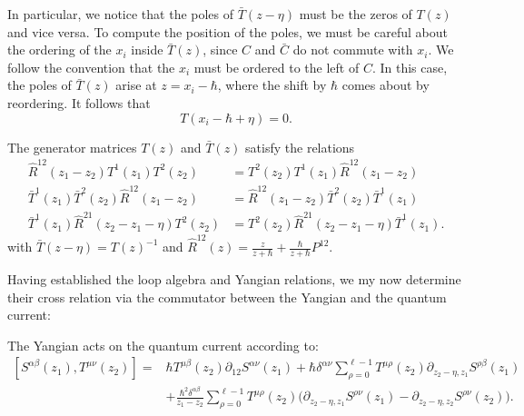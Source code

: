 \begin{remark}
In particular, we notice that the poles of $\bar{T}(z-\eta)$ must be the zeros of $T(z)$ and vice versa. To compute the position of the poles, we must be careful about the ordering of the $x_i$ inside $\bar{T}(z)$, since $C$ and $\bar C$ do not commute with $x_i$. We follow the convention that the $x_i$ must be ordered to the left of $C$. In this case, the poles of $\bar{T}(z)$ arise at $z=x_i-\hbar$, where the shift by $\hbar$ comes about by reordering. It follows that
\begin{equation}
T(x_i-\hbar+\eta) = 0.
\end{equation}
\end{remark}

\begin{theorem}
The generator matrices $T(z)$ and $\bar{T}(z)$ satisfy the relations
\begin{align}
\hat R^{12}(z_1-z_2) T^1(z_1) T^2(z_2) &= T^2(z_2) T^1(z_1) \hat R^{12}(z_1-z_2) \\
\bar{T}^1(z_1) \bar{T}^2(z_2) \hat R^{12}(z_1-z_2) &= \hat R^{12}(z_1-z_2) \bar{T}^2(z_2) \bar{T}^1(z_1) \\
\bar{T}^1(z_1) \hat R^{21}(z_2-z_1-\eta) T^2(z_2) &= T^2(z_2) \hat R^{21}(z_2-z_1-\eta) \bar{T}^1(z_1).
\end{align}
with $\bar{T}(z-\eta) = T(z)^{-1}$ and $\hat R^{12}(z) = \frac{z}{z+\hbar} + \frac{\hbar}{z+\hbar} P^{12}$.
\end{theorem}

Having established the loop algebra and Yangian relations, we my now determine their cross relation via the commutator between the Yangian and the quantum current:

\begin{prop}
The Yangian acts on the quantum current according to:
\begin{equation}\label{eq:crossRel}
\begin{aligned}
[S^{\alpha\beta}(z_1),T^{\mu\nu}(z_2)]
={}& \hbar T^{\mu\beta}(z_2) \partial_{12} S^{\alpha\nu}(z_1) + \hbar \delta^{\alpha\nu} \sum_{\rho=0}^{\ell-1} T^{\mu\rho}(z_2) \partial_{z_2-\eta,z_1} S^{\rho\beta}(z_1) \\
&+ \frac{\hbar^2 \delta^{\alpha\beta}}{z_1-z_2} \sum_{\rho=0}^{\ell-1} T^{\mu\rho}(z_2) \big( \partial_{z_2-\eta,z_1} S^{\rho\nu}(z_1) - \partial_{z_2-\eta,z_2} S^{\rho\nu}(z_2) \big).
\end{aligned}
\end{equation}
\end{prop}

